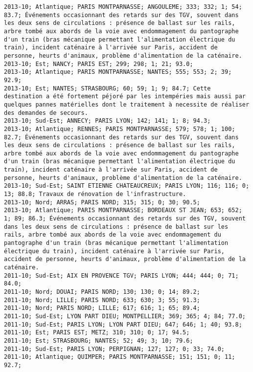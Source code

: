 \documentclass{article}
\begin{document}
\begin{Verbatim}[commandchars=\\\{\}]
2013-10; Atlantique; PARIS MONTPARNASSE; ANGOULEME; 333; 332; 1; 54; 83.7; Événements occasionnant des retards sur des TGV, souvent dans les deux sens de circulations : présence de ballast sur les rails, arbre tombé aux abords de la voie avec endommagement du pantographe d'un train (bras mécanique permettant l'alimentation électrique du train), incident caténaire à l'arrivée sur Paris, accident de personne, heurts d'animaux, problème d'alimentation de la caténaire.
2013-10; Est; NANCY; PARIS EST; 299; 298; 1; 21; 93.0; 
2013-10; Atlantique; PARIS MONTPARNASSE; NANTES; 555; 553; 2; 39; 92.9; 
2013-10; Est; NANTES; STRASBOURG; 60; 59; 1; 9; 84.7; Cette destination a été fortement péjoré par les intempéries mais aussi par quelques pannes matérielles dont le traitement à necessite de réaliser des demandes de secours.
2013-10; Sud-Est; ANNECY; PARIS LYON; 142; 141; 1; 8; 94.3; 
2013-10; Atlantique; RENNES; PARIS MONTPARNASSE; 579; 578; 1; 100; 82.7; Événements occasionnant des retards sur des TGV, souvent dans les deux sens de circulations : présence de ballast sur les rails, arbre tombé aux abords de la voie avec endommagement du pantographe d'un train (bras mécanique permettant l'alimentation électrique du train), incident caténaire à l'arrivée sur Paris, accident de personne, heurts d'animaux, problème d'alimentation de la caténaire.
2013-10; Sud-Est; SAINT ETIENNE CHATEAUCREUX; PARIS LYON; 116; 116; 0; 13; 88.8; Travaux de rénovation de l'infrastructure.
2013-10; Nord; ARRAS; PARIS NORD; 315; 315; 0; 30; 90.5; 
2013-10; Atlantique; PARIS MONTPARNASSE; BORDEAUX ST JEAN; 653; 652; 1; 89; 86.3; Événements occasionnant des retards sur des TGV, souvent dans les deux sens de circulations : présence de ballast sur les rails, arbre tombé aux abords de la voie avec endommagement du pantographe d'un train (bras mécanique permettant l'alimentation électrique du train), incident caténaire à l'arrivée sur Paris, accident de personne, heurts d'animaux, problème d'alimentation de la caténaire.
2011-10; Sud-Est; AIX EN PROVENCE TGV; PARIS LYON; 444; 444; 0; 71; 84.0; 
2011-10; Nord; DOUAI; PARIS NORD; 130; 130; 0; 14; 89.2; 
2011-10; Nord; LILLE; PARIS NORD; 633; 630; 3; 55; 91.3; 
2011-10; Nord; PARIS NORD; LILLE; 617; 616; 1; 65; 89.4; 
2011-10; Sud-Est; LYON PART DIEU; MONTPELLIER; 369; 365; 4; 84; 77.0; 
2011-10; Sud-Est; PARIS LYON; LYON PART DIEU; 647; 646; 1; 40; 93.8; 
2011-10; Est; PARIS EST; METZ; 310; 310; 0; 17; 94.5; 
2011-10; Est; STRASBOURG; NANTES; 52; 49; 3; 10; 79.6; 
2011-10; Sud-Est; PARIS LYON; PERPIGNAN; 127; 127; 0; 33; 74.0; 
2011-10; Atlantique; QUIMPER; PARIS MONTPARNASSE; 151; 151; 0; 11; 92.7; 

\end{Verbatim}
\end{document}
